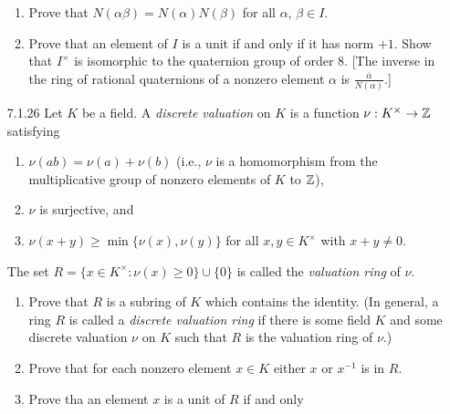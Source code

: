 \begin{enumerate}
\begin{enumerate}
                     \item Prove that $N(\alpha\beta) = N(\alpha)N(\beta)$ for
                           all $\alpha$, $\beta \in I$.
                     \item Prove that an element of $I$ is a unit if and only if
                           it has norm $+1$. Show that $I^\times$ is isomorphic
                           to the quaternion group of order 8. [The inverse in
                           the ring of rational quaternions of a nonzero element
                           $\alpha$ is $\frac{\overline{\alpha}}{N(\alpha)}$.]
                  \end{enumerate}
   \item[7.1.26]  Let $K$ be a field. A \textit{discrete valuation} on $K$ is a
                  function $\nu : K^\times \rightarrow \mathbb{Z}$ satisfying
                  \begin{enumerate}\renewcommand{\labelenumii}{(\roman{enumii})}
                     \item $\nu(ab) = \nu(a) + \nu(b)$ (i.e., $\nu$ is a
                           homomorphism from the multiplicative group of nonzero
                           elements of $K$ to $\mathbb{Z}$),
                     \item $\nu$ is surjective, and
                     \item $\nu(x + y) \ge \min\{\nu(x), \nu(y)\}$ for all
                           $x, y \in K^\times$ with $x + y \neq 0$.
                  \end{enumerate}
                  The set $R = \{x \in K^\times : \nu(x) \ge 0\} \cup \{0\}$ is
                  called the \textit{valuation ring} of $\nu$.
                  \begin{enumerate}
                     \item Prove that $R$ is a subring of $K$ which contains the
                           identity. (In general, a ring $R$ is called a
                           \textit{discrete valuation ring} if there is some
                           field $K$ and some discrete valuation $\nu$ on $K$
                           such that $R$ is the valuation ring of $\nu$.)
                     \item Prove that for each nonzero element $x \in K$ either
                           $x$ or $x^{-1}$ is in $R$.
                     \item Prove tha an element $x$ is a unit of $R$ if and only

\end{enumerate}
\end{enumerate}
